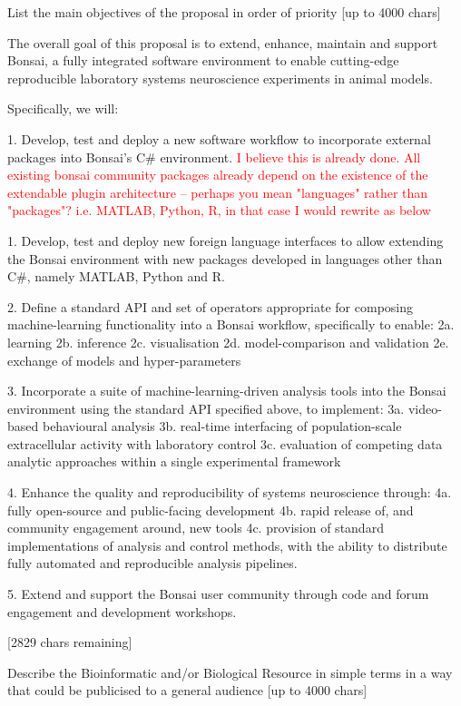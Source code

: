 
List the main objectives of the proposal in order of priority [up to
  4000 chars]

The overall goal of this proposal is to extend, enhance, maintain and support Bonsai, a fully integrated software environment to enable cutting-edge reproducible laboratory systems neuroscience experiments in animal models.

Specifically, we will:

1. Develop, test and deploy a new software workflow to incorporate external packages into Bonsai's C# environment. \textcolor{red}{I believe this is already done. All existing bonsai community packages already depend on the existence of the extendable plugin architecture -- perhaps you mean "languages" rather than "packages"? i.e. MATLAB, Python, R, in that case I would rewrite as below}

1. Develop, test and deploy new foreign language interfaces to allow extending the Bonsai environment with new packages developed in languages other than C#, namely MATLAB, Python and R.

2. Define a standard API and set of operators appropriate for composing machine-learning functionality into a Bonsai workflow, specifically to enable:
2a. learning
2b. inference
2c. visualisation
2d. model-comparison and validation
2e. exchange of models and hyper-parameters

3. Incorporate a suite of machine-learning-driven analysis tools into the Bonsai environment using the standard API specified above, to implement:
3a. video-based behavioural analysis
3b. real-time interfacing of population-scale extracellular activity with laboratory control  
3c. evaluation of competing data analytic approaches within a single experimental framework

4. Enhance the quality and reproducibility of systems neuroscience through:
4a. fully open-source and public-facing development
4b. rapid release of, and community engagement around, new tools
4c. provision of standard implementations of analysis and control methods, with the ability to distribute fully automated and reproducible analysis pipelines.

5. Extend and support the Bonsai user community through code and forum engagement and development workshops.

[2829 chars remaining]




Describe the Bioinformatic and/or Biological Resource in simple terms in a way that could be publicised to a general audience [up to 4000 chars]

